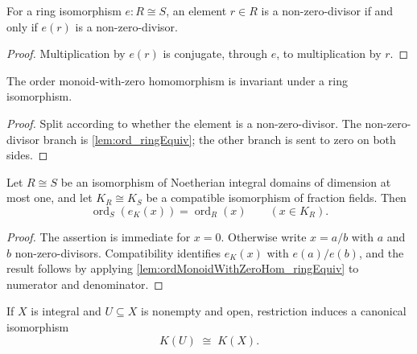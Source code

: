 \begin{lemma}
  \label{lem:nonZeroDivisors_ringEquiv}
  \leanok

  For a ring isomorphism \(e\colon R\cong S\), an element \(r\in R\) is a
  non-zero-divisor if and only if \(e(r)\) is a non-zero-divisor.
\end{lemma}
\begin{proof}
  \leanok
  Multiplication by \(e(r)\) is conjugate, through \(e\), to multiplication
  by \(r\).
\end{proof}

\begin{lemma}
  \label{lem:ordMonoidWithZeroHom_ringEquiv}
  \leanok

  The order monoid-with-zero homomorphism is invariant under a ring
  isomorphism.
\end{lemma}
\begin{proof}
  \leanok
  Split according to whether the element is a non-zero-divisor.  The
  non-zero-divisor branch is \cref{lem:ord_ringEquiv}; the other branch is
  sent to zero on both sides.
\end{proof}

\begin{lemma}
  \label{lem:ordFrac_ringEquiv}
  \leanok

  Let \(R\cong S\) be an isomorphism of Noetherian integral domains of
  dimension at most one, and let \(K_R\cong K_S\) be a compatible
  isomorphism of fraction fields.  Then
  \[
    \operatorname{ord}_{S}(e_K(x))
      =\operatorname{ord}_{R}(x)
    \qquad (x\in K_R).
  \]
\end{lemma}
\begin{proof}
  \leanok
  The assertion is immediate for \(x=0\).  Otherwise write \(x=a/b\) with
  \(a\) and \(b\) non-zero-divisors.  Compatibility identifies
  \(e_K(x)\) with \(e(a)/e(b)\), and the result follows by applying
  \cref{lem:ordMonoidWithZeroHom_ringEquiv} to numerator and denominator.
\end{proof}

\begin{definition}
  \label{def:functionFieldIso}
  \leanok

  If \(X\) is integral and \(U\subseteq X\) is nonempty and open, restriction
  induces a canonical isomorphism
  \[
    K(U)\;\cong\;K(X).
  \]
\end{definition}

